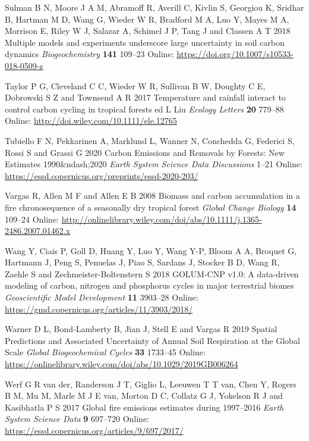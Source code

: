 \documentclass[
]{article}
\newlength{\cslhangindent}
\newenvironment{cslreferences}%
  {\setlength{\parindent}{0pt}%
  \everypar{\setlength{\hangindent}{\cslhangindent}}\ignorespaces}%
  {\par}
\begin{document}
\begin{cslreferences}
\leavevmode\hypertarget{ref-sulman_multiple_2018}{}%
Sulman B N, Moore J A M, Abramoff R, Averill C, Kivlin S, Georgiou K,
Sridhar B, Hartman M D, Wang G, Wieder W R, Bradford M A, Luo Y, Mayes M
A, Morrison E, Riley W J, Salazar A, Schimel J P, Tang J and Classen A T
2018 Multiple models and experiments underscore large uncertainty in
soil carbon dynamics \emph{Biogeochemistry} \textbf{141} 109--23 Online:
\url{https://doi.org/10.1007/s10533-018-0509-z}

\leavevmode\hypertarget{ref-taylor_temperature_2017}{}%
Taylor P G, Cleveland C C, Wieder W R, Sullivan B W, Doughty C E,
Dobrowski S Z and Townsend A R 2017 Temperature and rainfall interact to
control carbon cycling in tropical forests ed L Liu \emph{Ecology
Letters} \textbf{20} 779--88 Online:
\url{http://doi.wiley.com/10.1111/ele.12765}

\leavevmode\hypertarget{ref-tubiello_carbon_2020}{}%
Tubiello F N, Pekkarinen A, Marklund L, Wanner N, Conchedda G, Federici
S, Rossi S and Grassi G 2020 Carbon Emissions and Removals by Forests:
New Estimates 1990\&ndash;2020 \emph{Earth System Science Data
Discussions} 1--21 Online:
\url{https://essd.copernicus.org/preprints/essd-2020-203/}

\leavevmode\hypertarget{ref-vargas_biomass_2008}{}%
Vargas R, Allen M F and Allen E B 2008 Biomass and carbon accumulation
in a fire chronosequence of a seasonally dry tropical forest
\emph{Global Change Biology} \textbf{14} 109--24 Online:
\url{http://onlinelibrary.wiley.com/doi/abs/10.1111/j.1365-2486.2007.01462.x}

\leavevmode\hypertarget{ref-wang_golum-cnp_2018}{}%
Wang Y, Ciais P, Goll D, Huang Y, Luo Y, Wang Y-P, Bloom A A, Broquet G,
Hartmann J, Peng S, Penuelas J, Piao S, Sardans J, Stocker B D, Wang R,
Zaehle S and Zechmeister-Boltenstern S 2018 GOLUM-CNP v1.0: A
data-driven modeling of carbon, nitrogen and phosphorus cycles in major
terrestrial biomes \emph{Geoscientific Model Development} \textbf{11}
3903--28 Online: \url{https://gmd.copernicus.org/articles/11/3903/2018/}

\leavevmode\hypertarget{ref-warner_spatial_2019}{}%
Warner D L, Bond‐Lamberty B, Jian J, Stell E and Vargas R 2019 Spatial
Predictions and Associated Uncertainty of Annual Soil Respiration at the
Global Scale \emph{Global Biogeochemical Cycles} \textbf{33} 1733--45
Online:
\url{https://onlinelibrary.wiley.com/doi/abs/10.1029/2019GB006264}

\leavevmode\hypertarget{ref-van_der_werf_global_2017}{}%
Werf G R van der, Randerson J T, Giglio L, Leeuwen T T van, Chen Y,
Rogers B M, Mu M, Marle M J E van, Morton D C, Collatz G J, Yokelson R J
and Kasibhatla P S 2017 Global fire emissions estimates during
1997--2016 \emph{Earth System Science Data} \textbf{9} 697--720 Online:
\url{https://essd.copernicus.org/articles/9/697/2017/}


\end{cslreferences}
\end{document}
